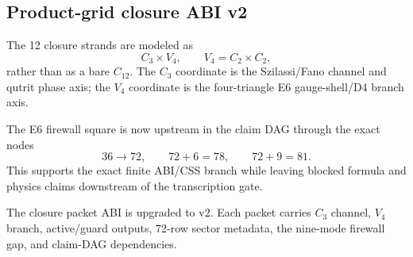 \subsection{Product-grid closure ABI v2}
\label{sec:bt1480-bt1482-product-grid-abi-v2}

The 12 closure strands are modeled as
\[
C_3\times V_4,
\qquad V_4=C_2\times C_2,
\]
rather than as a bare \(C_{12}\).  The \(C_3\) coordinate is the
Szilassi/Fano channel and qutrit phase axis; the \(V_4\) coordinate is the
four-triangle E6 gauge-shell/D4 branch axis.

The E6 firewall square is now upstream in the claim DAG through the exact nodes
\[
36\to72,
\qquad
72+6=78,
\qquad
72+9=81.
\]
This supports the exact finite ABI/CSS branch while leaving blocked formula and
physics claims downstream of the transcription gate.

The closure packet ABI is upgraded to v2.  Each packet carries \(C_3\) channel,
\(V_4\) branch, active/guard outputs, 72-row sector metadata, the nine-mode
firewall gap, and claim-DAG dependencies.

